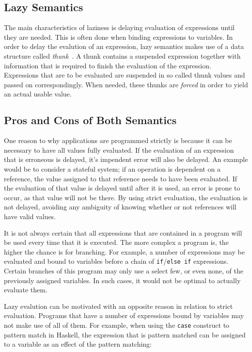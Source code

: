 \subsection{Lazy Semantics}
\label{back:lazySem}
The main characteristics of laziness is delaying evaluation of expressions
until they are needed. This is often done when binding expressions to
variables. In order to delay the evalution of an expression, lazy semantics
makes use of a data structure called
\textit{thunk}~\cite{Ennals:2003:OEA:944746.944731}. A thunk contains a
suspended expression together with information that is required to finish the
evaluation of the expression. Expressions that are to be
evaluated are suspended in so called thunk values and passed on correspondingly.
When needed, these thunks are \textit{forced} in order to yield an actual usable
value.

\subsection{Pros and Cons of Both Semantics}
One reason to why applications are programmed strictly is because it can be
necessary to have all values fully evaluated. If the evaluation of an expression
that is erroneous is delayed, it's impendent error will also be delayed.
An example would be to consider a stateful system; if an operation is dependent
on a reference, the value assigned to that reference needs to have been
evaluated. If the evaluation of that value is delayed until after it is used,
an error is prone to occur, as that value will not be there.
By using strict evaluation, the evaluation is not delayed, avoiding any
ambiguity of knowing whether or not references will have valid values.

It is not always certain that all expressions that are contained in a program
will be used every time that it is executed. The more complex a program is, the
higher the chance is for branching. For example, a number of expressions may
be evaluated and bound to variables before a chain of
\texttt{if}/\texttt{else if} expressions. Certain branches of this program may
only use a select few, or even none, of the previously assigned variables.
In such cases, it would not be optimal to actually evaluate them.

Lazy evalution can be motivated with an opposite reason in relation to strict
evaluation. Programs that have a number of expressions bound by variables may
not make use of all of them. For example, when using the \texttt{case} construct
to pattern match in Haskell, the expression that is pattern matched can be
assigned to a variable as an effect of the pattern matching:

